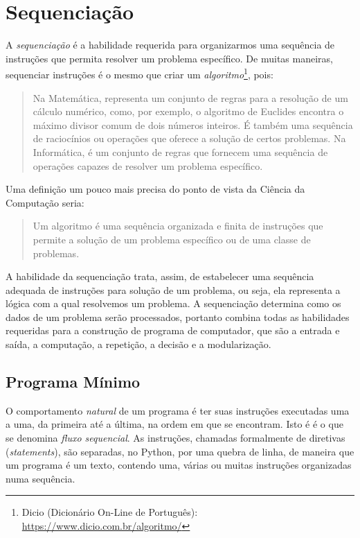 \documentclass[
]{book}
\begin{document}
\hypertarget{seque}{%
\chapter{Sequenciação}\label{seque}}

A \emph{sequenciação} é a habilidade requerida para organizarmos uma sequência de instruções que permita resolver um problema específico. De muitas maneiras, sequenciar instruções é o mesmo que criar um \emph{algoritmo}\footnote{Dicio (Dicionário On-Line de Português): \url{https://www.dicio.com.br/algoritmo/}}, pois:

\begin{quote}
Na Matemática, representa um conjunto de regras para a resolução de um cálculo numérico, como, por exemplo, o algoritmo de Euclides encontra o máximo divisor comum de dois números inteiros. É também uma sequência de raciocínios ou operações que oferece a solução de certos problemas.
Na Informática, é um conjunto de regras que fornecem uma sequência de operações capazes de resolver um problema específico.
\end{quote}

Uma definição um pouco mais precisa do ponto de vista da Ciência da Computação seria:

\begin{quote}
Um algoritmo é uma sequência organizada e finita de instruções que permite a solução de um problema específico ou de uma classe de problemas.
\end{quote}

A habilidade da sequenciação trata, assim, de estabelecer uma sequência adequada de instruções para solução de um problema, ou seja, ela representa a lógica com a qual resolvemos um problema. A sequenciação determina como os dados de um problema serão processados, portanto combina todas as habilidades requeridas para a construção de programa de computador, que são a entrada e saída, a computação, a repetição, a decisão e a modularização.

\hypertarget{seque-progr}{%
\section{Programa Mínimo}\label{seque-progr}}

O comportamento \emph{natural} de um programa é ter suas instruções executadas uma a uma, da primeira até a última, na ordem em que se encontram. Isto é é o que se denomina \emph{fluxo sequencial}. As instruções, chamadas formalmente de diretivas (\emph{statements}), são separadas, no Python, por uma quebra de linha, de maneira que um programa é um texto, contendo uma, várias ou muitas instruções organizadas numa sequência.
\end{document}

